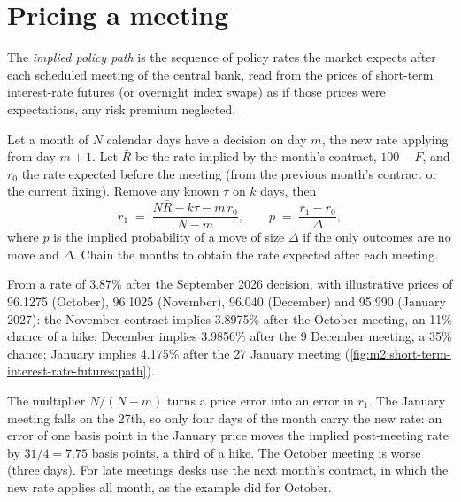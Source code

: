 \section{Pricing a meeting}

\begin{definition}\label{def:m2:short-term-interest-rate-futures:path}
The \emph{implied policy path} is the sequence of policy
rates the market expects after each scheduled meeting of the central bank, read
from the prices of short-term interest-rate futures (or overnight index swaps)
as if those prices were expectations, any risk premium neglected.
\end{definition}

\begin{method}\label{met:m2:short-term-interest-rate-futures:meeting}
Let a month of $N$ calendar days have a decision on day $m$, the new rate
applying from day $m + 1$. Let $\bar R$ be the rate implied by the month's
contract, $100 - F$, and $r_0$ the rate expected before the meeting (from the
previous month's contract or the current fixing). Remove any known  $\tau$ on $k$ days, then
\[
r_1 \;=\; \frac{N\bar R - k\tau - m\,r_0}{N - m},
\qquad
p \;=\; \frac{r_1 - r_0}{\Delta},
\]
where $p$ is the implied probability of a move of size $\Delta$ if the only
outcomes are no move and $\Delta$. Chain the months to obtain the rate expected
after each meeting.
\end{method}

\begin{example}\label{ex:m2:short-term-interest-rate-futures:path}
From a rate of 3.87\% after the September 2026 decision, with illustrative
prices of 96.1275 (October), 96.1025 (November), 96.040 (December) and 95.990
(January 2027): the November contract implies 3.8975\% after the October
meeting, an 11\% chance of a hike; December implies 3.9856\% after the 9
December meeting, a 35\% chance; January implies 4.175\% after the 27 January
meeting (\cref{fig:m2:short-term-interest-rate-futures:path}).
\end{example}

\begin{remark}\label{rem:m2:short-term-interest-rate-futures:fragile}
The multiplier $N/(N - m)$ turns a price error into an error in $r_1$. The
January meeting falls on the 27th, so only four days of the month carry the
new rate: an error of one basis point in the January price moves the implied
post-meeting rate by $31/4 = 7.75$ basis points, a third of a hike. The October
meeting is worse (three days). For late meetings desks use the next month's
contract, in which the new rate applies all month, as the example did for
October.
\end{remark}


